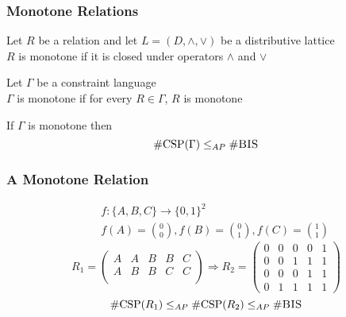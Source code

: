 \documentclass[a4paper,handout]{beamer}
\newcommand{\ccsp}{\#CSP}
\newcommand{\cbis}{\#\textsc{BIS}}
\newcommand{\aple}{\le_{AP}}
\theoremstyle{definition}
\begin{document}
\begin{frame}
\frametitle{Monotone Relations}
\begin{definition}
Let \(R\) be a relation and let \(L=(D, \wedge, \vee)\) be a \textcolor{mygreen}{distributive lattice}\\
\(R\) is \textcolor{mygreen}{monotone} if it is closed under operators \(\wedge\) and \(\vee\) 
\end{definition}

\begin{definition}
Let \(\Gamma\) be a constraint language\\
\(\Gamma\) is monotone if for every \(R\in \Gamma\), \(R\) is monotone
\end{definition}

\begin{theorem} 
If \(\Gamma\) is monotone then
\[\mathrm{\ccsp(}\Gamma\mathrm{)}\aple\mathrm{\cbis}\]
\end{theorem}
\end{frame}

\begin{frame}
\frametitle{A Monotone Relation}
\begin{example}
\begin{center}
\end{center}
\pause
\begin{eqnarray*}
&&f : \{A,B,C\} \to \{0,1\}^2\\
&&f(A) = \binom 00, f(B) = \binom 01, f(C) = \binom 11
\end{eqnarray*}
\pause
\vspace{-12pt}
\[R_1 = \begin{pmatrix}
A & A & B & B & C\\
A & B & B & C & C\\
\end{pmatrix} 
\Rightarrow
R_2 = \begin{pmatrix}
0 & 0 & 0 & 0 & 1 \\
0 & 0 & 1 & 1 & 1 \\
0 & 0 & 0 & 1 & 1 \\
0 & 1 & 1 & 1 & 1
\end{pmatrix} \]
\pause
\[\mathrm{\ccsp(}R_1\mathrm{)}\aple\mathrm{\ccsp(}R_2\mathrm{)}\aple\mathrm{\cbis}\]
\end{example}
\end{frame}
\end{document}
